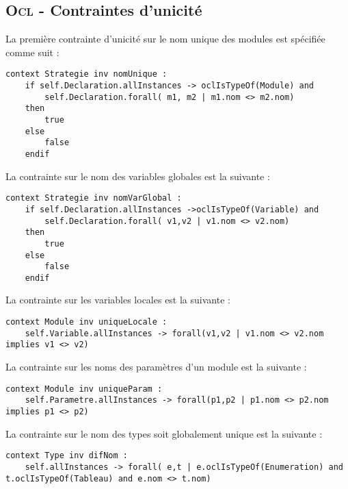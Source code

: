 
\subsection{\textsc{Ocl} - Contraintes d'unicité}
\label{sec:question14}

La première contrainte d'unicité sur le nom unique des modules est spécifiée comme suit :

\begin{lstlisting}[caption=Nom unique au sein d'une stratégie,captionpos=b,label={lst:nom_unique},language=OCL]
context Strategie inv nomUnique :
	if self.Declaration.allInstances -> oclIsTypeOf(Module) and
		self.Declaration.forall( m1, m2 | m1.nom <> m2.nom)
	then
		true
	else
		false
	endif
\end{lstlisting}

La contrainte sur le nom des variables globales est la suivante :

\begin{lstlisting}[caption=Nom unique d'une variable globale,captionpos=b,label={lst:unique_globale},language=OCL]
context Strategie inv nomVarGlobal :
	if self.Declaration.allInstances ->oclIsTypeOf(Variable) and
		self.Declaration.forall( v1,v2 | v1.nom <> v2.nom)
	then
		true
	else
		false
	endif
\end{lstlisting}

La contrainte sur les variables locales est la suivante :

\begin{lstlisting}[caption=Nom unique des variables locales,captionpos=b,label={lst:nom_locale},language=OCL]
context Module inv uniqueLocale :
	self.Variable.allInstances -> forall(v1,v2 | v1.nom <> v2.nom implies v1 <> v2)
\end{lstlisting}

La contrainte sur les noms des paramètres d'un module est la suivante :

\begin{lstlisting}[caption=Nom unique des paramètres,captionpos=b,label={lst:unique_param},language=OCL]
context Module inv uniqueParam :
	self.Parametre.allInstances -> forall(p1,p2 | p1.nom <> p2.nom implies p1 <> p2)
\end{lstlisting}

La contrainte sur le nom des types soit globalement unique est la suivante :

\begin{lstlisting}[caption=Nom unique des types,captionpos=b,label={lst:type_unique},language=OCL]
context Type inv difNom :
	self.allInstances -> forall( e,t | e.oclIsTypeOf(Enumeration) and t.oclIsTypeOf(Tableau) and e.nom <> t.nom)
\end{lstlisting}
